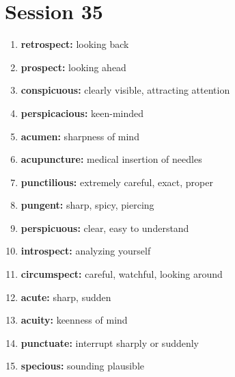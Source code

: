 \documentclass{article}
\begin{document}
\section{Session 35}
\begin{enumerate}
    \item \textbf{retrospect: }{looking back}
    \item \textbf{prospect: }{looking ahead}
    \item \textbf{conspicuous: }{clearly visible, attracting attention}
    \item \textbf{perspicacious: }{keen-minded}
    \item \textbf{acumen: }{sharpness of mind}
    \item \textbf{acupuncture: }{medical insertion of needles}
    \item \textbf{punctilious: }{extremely careful, exact, proper}
    \item \textbf{pungent: }{sharp, spicy, piercing}
    \item \textbf{perspicuous: }{clear, easy to understand}
    \item \textbf{introspect: }{analyzing yourself}
    \item \textbf{circumspect: }{careful, watchful, looking around}
    \item \textbf{acute: }{sharp, sudden}
    \item \textbf{acuity: }{keenness of mind}
    \item \textbf{punctuate: }{interrupt sharply or suddenly}
    \item \textbf{specious: }{sounding plausible}
    
\end{enumerate}
\end{document}
